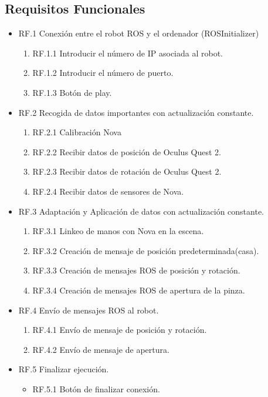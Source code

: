 \subsection{Requisitos Funcionales}
\begin{itemize}
    \item RF.1 Conexión entre el robot ROS\cite{ROS} y el ordenador (ROSInitializer)
    \begin{enumerate}
        \item RF.1.1 Introducir el número de IP asociada al robot.
        \item RF.1.2 Introducir el número de puerto.
        \item RF.1.3 Botón de play.
    \end{enumerate}
    \item RF.2 Recogida de datos importantes con actualización constante.
    \begin{enumerate}
        \item RF.2.1 Calibración Nova
        \item RF.2.2 Recibir datos de posición de Oculus Quest 2.
        \item RF.2.3 Recibir datos de rotación de Oculus Quest 2.
        \item RF.2.4 Recibir datos de sensores de Nova.
    \end{enumerate}
    \item RF.3 Adaptación y Aplicación de datos con actualización constante.
    \begin{enumerate}
        \item RF.3.1 Linkeo de manos con Nova en la escena.
        \item RF.3.2 Creación de mensaje de posición predeterminada(casa).
        \item RF.3.3 Creación de mensajes ROS de posición y rotación.
        \item RF.3.4 Creación de mensajes ROS de apertura de la pinza.
    \end{enumerate}
    \item RF.4 Envío de mensajes ROS al robot.
    \begin{enumerate}
        \item RF.4.1 Envío de mensaje de posición y rotación.
        \item RF.4.2 Envío de mensaje de apertura.
    \end{enumerate}
    \item RF.5 Finalizar ejecución.
    \begin{itemize}
        \item RF.5.1 Botón de finalizar conexión.
    \end{itemize}
\end{itemize}


